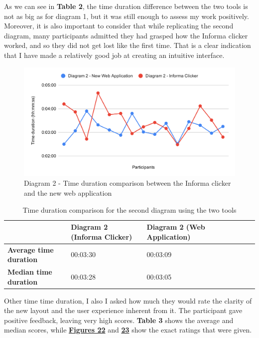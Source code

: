 \documentclass[]{usiinfbachelorproject}
\begin{document}
\noindent As we can see in \textbf{Table 2}, the time duration difference between the two tools is not as big as for diagram 1, but it was still enough to assess my work positively. Moreover, it is also important to consider that while replicating the second diagram, many participants admitted they had grasped how the Informa clicker worked, and so they did not get lost like the first time. That is a clear indication that I have made a relatively good job at creating an intuitive interface.

\begin{figure}[h!]
\centering
\includegraphics[scale=0.7]{figures/diagram2-time-comparison.png}
\caption {Diagram 2 - Time duration comparison between the Informa clicker and the new web application}
\end{figure}

\begin{table}[h!]
\centering
\begin{tabular}{|l|l|l|l|l|l|l|}
\hline
 & \textbf{Diagram 2 (Informa Clicker)} & \textbf{Diagram 2 (Web Application)} \\ \hline
\textbf{Average time duration} & 00:03:30 & 00:03:09 \\ \hline
\textbf{Median time duration} & 00:03:28 & 00:03:05 \\ \hline
\end{tabular}
\caption{Time duration comparison for the second diagram using the two tools}
\end{table}

\noindent Other time time duration, I also I asked how much they would rate the clarity of the new layout and the user experience inherent from it. The participant gave positive feedback, leaving very high scores. \textbf{Table 3} shows the average and median scores, while \hyperref[clarity]{\textbf{Figures 22}} and \hyperref[ux-ratings]{\textbf{23}} show the exact ratings that were given. 
\end{document}
